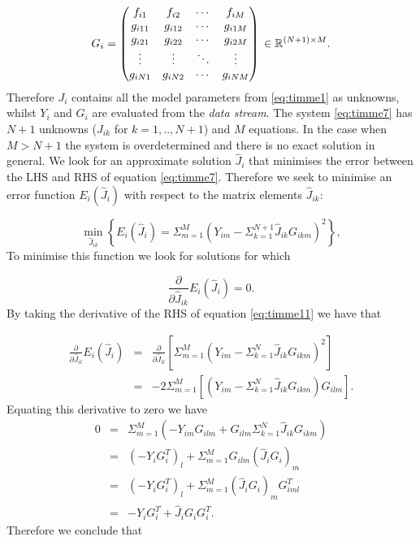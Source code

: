 \begin{equation}\label{eq:timme100}
G_{i} = 
\begin{pmatrix}
  f_{i1}  &    f_{i2} & \cdots & f_{iM}         \\
  g_{i11} & g_{i12} & \cdots & g_{i1M} \\
  g_{i21} & g_{i22} & \cdots & g_{i2M} \\
  \vdots    & \vdots    & \ddots & \vdots    \\
  g_{iN1} & g_{iN2} & \cdots & g_{iNM} \\
\end{pmatrix}\\
\in{\mathbb{R}^{(N+1)\times M}}.
\end{equation}
%
Therefore $J_i$ contains all the model parameters from \eqref{eq:timme1} as unknowns, whilst $Y_i$ and $G_i$ are evaluated from the \emph{data stream}. The system \eqref{eq:timme7} has $N+1$ unknowns ($J_{ik}$ for $k=1,..,N+1$) and $M$ equations. In the case when $M>N+1$ the system is overdetermined and there is no exact solution in general. We look for an approximate solution $\hat{J}_i$ that minimises the error between the LHS and RHS of equation \eqref{eq:timme7}. Therefore we seek to minimise an error function $E_i(\hat{J}_i)$ with respect to the matrix elements $\hat{J}_{ik}$:

\begin{equation}\label{eq:timme11}
\min_{\hat{J}_{ik}} \left\lbrace E_i(\hat{J}_i) = \Sigma_{m=1}^{M}\left(Y_{im} - \Sigma_{k=1}^{N+1}\hat{J}_{ik}G_{ikm}\right)^2 \right\rbrace,
\end{equation}
%
To minimise this function we look for solutions for which

\begin{equation}\label{eq:timme12}
\frac{\partial}{\partial \hat{J}_{ik}} E_i(\hat{J}_i) = 0.
\end{equation}
%
By taking the derivative of the RHS of equation \eqref{eq:timme11} we have that

\begin{eqnarray}
\frac{\partial}{\partial \hat{J}_{il}} E_i(\hat{J}_i) &=& \frac{\partial}{\partial \hat{J}_{il}} \left[\Sigma_{m=1}^{M}\left(Y_{im} - \Sigma_{k=1}^{N}\hat{J}_{ik}G_{ikm}\right)^2\right] \nonumber \\
    &=& -2\Sigma_{m=1}^{M}\left[\left(Y_{im} - \Sigma_{k=1}^{N}\hat{J}_{ik}G_{ikm}\right)G_{ilm}\right]. \nonumber
\end{eqnarray}
%
Equating this derivative to zero we have
\begin{eqnarray}
0 &=& \Sigma_{m=1}^{M}\left(-Y_{im}G_{ilm} + G_{ilm}\Sigma_{k=1}^{N}\hat{J}_{ik}G_{ikm}\right) \nonumber \\
  &=& \left(-Y_iG_i^T\right)_{l} + \Sigma_{m=1}^{M}G_{ilm}\left(\hat{J}_iG_i\right)_m   \nonumber \\
  &=& \left(-Y_iG_i^T\right)_{l} + \Sigma_{m=1}^{M}\left(\hat{J}_iG_i\right)_mG_{iml}^T  \nonumber \\
   &=& -Y_iG_i^T + \hat{J}_iG_iG_i^T. 
\end{eqnarray}
%
Therefore we conclude that

